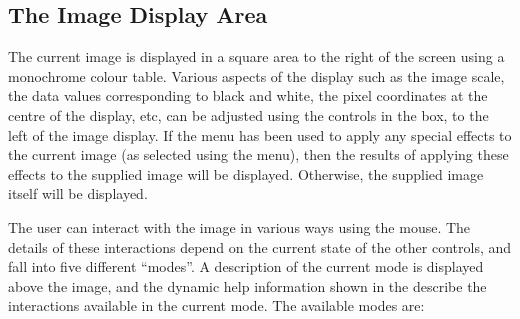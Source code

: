 \documentclass[11pt,nolof]{starlink}
\providecommand{\mylabel}[1] {\xlabel{#1}\label{#1}}
\begin{document}
\subsection {\mylabel{POLKA_IMAGE_DISPLAY}The Image Display Area}
The current image is displayed in a square area to the right of the
screen using a monochrome colour table. Various aspects of the display
such as the image scale, the data values corresponding to black and
white, the pixel coordinates at the centre of the display, etc, can be
adjusted using the controls in the  box, to the left of the image
display. If the  menu has
been used to apply any special effects to the current image (as selected
using the  menu), then the
results of applying these effects to the supplied image will be
displayed. Otherwise, the supplied image itself will be displayed.

The user can interact with the image in various ways using the mouse. The
details of these interactions depend on the current state of the other
controls, and fall into five different ``modes''. A description of the
current mode is displayed above the image, and the dynamic help
information shown in the 
describe the interactions available in the current mode. The available
modes are:
\end{document}
